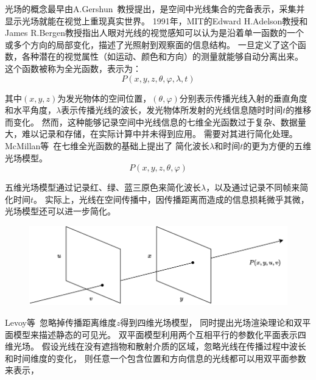 光场的概念最早由A.Gershun~\cite{gershun1939light}教授提出，是空间中光线集合的完备表示，采集并显示光场就能在视觉上重现真实世界。
1991年，MIT的Edward H.Adelson教授和James R.Bergen\cite{adelson1991plenoptic}教授指出人眼对光线的视觉感知可以认为是沿着单一函数的一个或多个方向的局部变化，描述了光照射到观察面的信息结构。
一旦定义了这个函数，各种潜在的视觉属性（如运动、颜色和方向）的测量就能够自动分离出来。
这个函数被称为全光函数，表示为：
\begin{equation}
	P(x,y,z,\theta,\varphi,\lambda,t)
\end{equation}\par
其中$(x,y,z)$为发光物体的空间位置，$(\theta,\varphi)$分别表示传播光线入射的垂直角度和水平角度，$\lambda$表示传播光线的波长，发光物体所发射的光线信息随时时间$t$的推移而变化。
然而，这种能够记录空间中光线信息的七维全光函数过于复杂、数据量大，难以记录和存储，在实际计算中并未得到应用。
需要对其进行简化处理。
McMillan等~\cite{mcmillan2023plenoptic}在七维全光函数的基础上提出了
简化波长$\lambda$和时间$t$的更为方便的五维光场模型。
\begin{equation}
	P(x,y,z,\theta,\varphi)
\end{equation}\par
五维光场模型通过记录红、绿、蓝三原色来简化波长$\lambda$，以及通过记录不同帧来简化时间$t$。
实际上，光线在空间传播中，因传播距离而造成的信息损耗微乎其微，光场模型还可以进一步简化。
%
%
%
%
\begin{figure}[!ht]
	\centering
	\includegraphics[width=0.95\linewidth]{figures/chapter2/double_plane_model.drawio}
	\label{chapter2_fig1:double_plane}
\end{figure}
%
%
%
%
Levoy等~\cite{levoy2023light}忽略掉传播距离维度$z$得到四维光场模型，
同时提出光场渲染理论和双平面模型来描述静态的可见光。
双平面模型利用两个互相平行的参数化平面表示四维光场。
假设光线在没有遮挡物和散射介质的区域，忽略光线在传播过程中波长和时间维度的变化，
则任意一个包含位置和方向信息的光线都可以用双平面参数来表示，

